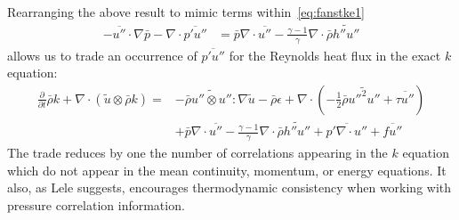 \documentclass[letterpaper,11pt,nointlimits,reqno]{amsart}
\begin{document}
Rearranging the above result to mimic terms within~\eqref{eq:fanstke1}
\begin{align}
  - \overline{u''}\cdot\nabla\bar{p}
  - \nabla\cdot\overline{p'u''}
&=
  \bar{p}\nabla\cdot\overline{u''}
- \frac{\gamma-1}{\gamma} \nabla\cdot \bar{\rho} \widetilde{h''u''}
\end{align}
allows us to trade an occurrence of $\overline{p'u''}$ for the Reynolds heat
flux in the exact $k$ equation:
\begin{align}
\label{eq:fanstke}
    \frac{\partial{}}{\partial{}t}\bar{\rho}k
  + \nabla\cdot(\tilde{u}\otimes\bar{\rho}k)
 =
 &- \bar{\rho} \widetilde{u''\otimes{}u''} : \nabla\tilde{u}
  - \bar{\rho} \epsilon
  + \nabla\cdot\left(
        -\frac{1}{2}\bar{\rho}\widetilde{{u''}^{2}u''}
      + \overline{\tau{}u''}
    \right)
\\
 &+ \bar{p}\nabla\cdot\overline{u''}
  - \frac{\gamma-1}{\gamma} \nabla\cdot\bar{\rho} \widetilde{h''u''}
  + \overline{p' \nabla\cdot{}u''}
  + \overline{fu''}
\end{align}
The trade reduces by one the number of correlations appearing in the $k$
equation which do not appear in the mean continuity, momentum, or energy
equations.  It also, as Lele suggests, encourages thermodynamic consistency
when working with pressure correlation information.
\end{document}
